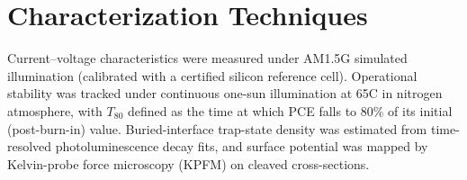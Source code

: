 \section{Characterization Techniques}

Current--voltage characteristics were measured under AM1.5G simulated
illumination (calibrated with a certified silicon reference cell).
Operational stability was tracked under continuous one-sun illumination at
65\textdegree C in nitrogen atmosphere, with $T_{80}$ defined as the time
at which PCE falls to 80\% of its initial (post-burn-in) value.
Buried-interface trap-state density was estimated from time-resolved
photoluminescence decay fits, and surface potential was mapped by
Kelvin-probe force microscopy (KPFM) on cleaved cross-sections.
